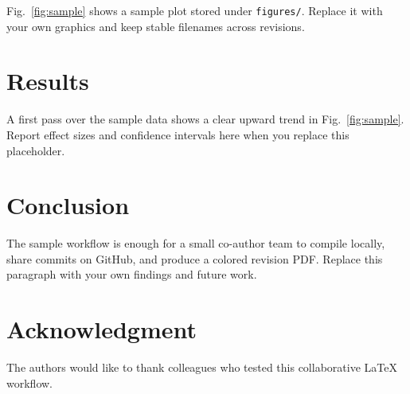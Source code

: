 \documentclass[journal]{IEEEtran}
\begin{document}
Fig.~\ref{fig:sample} shows a sample plot stored under
\texttt{figures/}. Replace it with your own graphics and keep stable
filenames across revisions.

\section{Results}

A first pass over the sample data shows a clear upward trend in
Fig.~\ref{fig:sample}. Report effect sizes and confidence intervals
here when you replace this placeholder.

\section{Conclusion}

The sample workflow is enough for a small co-author team to compile
locally, share commits on GitHub, and produce a colored revision PDF.
Replace this paragraph with your own findings and future work.

\section*{Acknowledgment}

The authors would like to thank colleagues who tested this collaborative
{\LaTeX} workflow.



\end{document}
